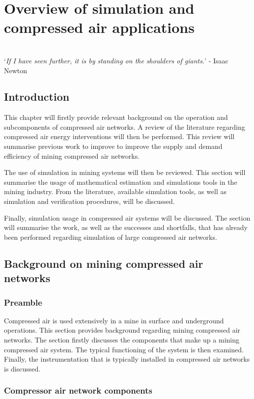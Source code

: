 \chapter{Overview of simulation and compressed air applications}
\label{Chap2}
\thispagestyle{empty}
\vspace{38em}
\hrulefill
\\
\enquote*{\textit{If I have seen further, it is by standing on the shoulders of giants.}} - Isaac Newton\\
\clearpage
\section{Introduction}
 This chapter will firstly provide relevant background on the operation and subcomponents of compressed air networks. A review of the literature regarding compressed air energy interventions will then be performed. This review will summarise previous work to improve to improve the supply and demand efficiency of mining compressed air networks.
\par
The use of simulation in mining systems will then be reviewed. This section will summarise the usage of mathematical estimation and simulations tools in the mining industry.  From the literature, available simulation tools, as well as simulation and verification procedures, will be discussed.
\par
Finally, simulation usage in compressed air systems will be discussed. The section will summarise the work, as well as the successes and shortfalls, that has already been performed regarding simulation of large compressed air networks.
\section{Background on mining compressed air networks}
\subsection{Preamble}
Compressed air is used extensively in a mine in surface and underground operations. This section provides background regarding mining compressed air networks. The section firstly discusses the components that make up a mining compressed air system. The typical functioning of the system is then examined. Finally, the instrumentation that is typically installed in compressed air networks is discussed.
\subsection{Compressor air network components}
